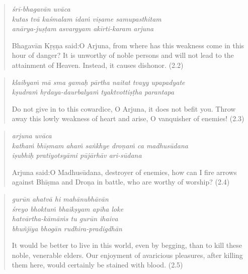 \documentclass[12pt, twoside, openright]{memoir}
\begin{document}
\par
\begin{verse}
\textit{śrī-bhagavān uvāca} \\
\textit{kutas tvā kaśmalam idaṁ viṣame samupasthitam} \\
\textit{anārya-juṣṭam asvargyam akīrti-karam arjuna}

\noindent \quad Bhagavān Kṛṣṇa said:\linebreak O Arjuna, from where has this weakness come in this hour of danger? It is unworthy of noble persons and will not lead to the attainment of Heaven. Instead, it causes dishonor. (2.2)
\end{verse}
\par



\par
\begin{verse}
\textit{klaibyaṁ mā sma gamaḥ pārtha naitat tvayy upapadyate} \\
\textit{kṣudraṁ hṛdaya-daurbalyaṁ tyaktvottiṣṭha parantapa}

\noindent Do not give in to this cowardice, O Arjuna, it does not befit you. Throw away this lowly weakness of heart and arise, O vanquisher of enemies! (2.3)
\end{verse}
\par



\par
\begin{verse}
\textit{arjuna uvāca} \\
\textit{kathaṁ bhīṣmam ahaṁ saṅkhye droṇaṁ ca madhusūdana} \\
\textit{iṣubhiḥ pratiyotsyāmi pūjārhāv ari-sūdana}

\noindent \quad Arjuna said:\linebreak O Madhusūdana, destroyer of enemies, how can I fire arrows against Bhīṣma and Droṇa in battle, who are worthy of worship? (2.4)
\end{verse}
\par



\par
\begin{verse}
\textit{gurūn ahatvā hi mahānubhāvān} \\
\textit{śreyo bhoktuṁ bhaikṣyam apīha loke} \\
\textit{hatvārtha-kāmāṁs tu gurūn ihaiva} \\
\textit{bhuñjīya bhogān rudhira-pradigdhān}

\noindent It would be better to live in this world, even by begging, than to kill these noble, venerable elders. Our enjoyment of avaricious pleasures, after killing them here, would certainly be stained with blood. (2.5)
\end{verse}
\par
\end{document}
